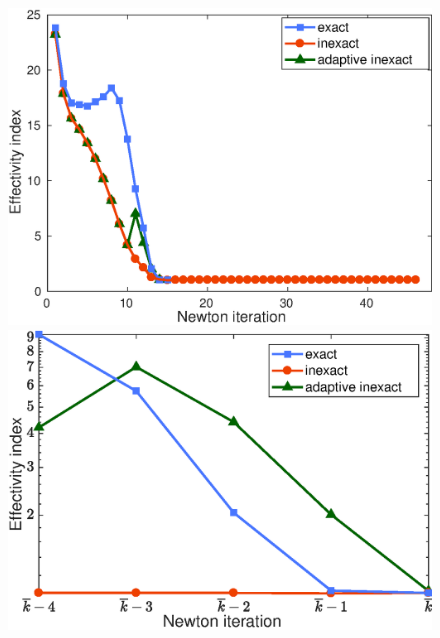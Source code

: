 \documentclass{beamer}
\begin{document}
\begin{frame}
\begin{figure}
\begin{minipage}[c]{.46\linewidth}
   \centering
\includegraphics[width=\textwidth]{fig_article/effectivity_index_3_methods_Hmax_015.eps}    
\end{minipage}\hfill
\begin{minipage}[c]{.46\linewidth}
   \centering
\includegraphics[width=\textwidth]{fig_article/effectivity_index_3_methods_last_newton_iter_Hmax_015.eps}     
\end{minipage}\hfill
\begin{minipage}[c]{.48\linewidth}
   \centering

\end{minipage}
\end{figure}
\end{frame}
\end{document}

